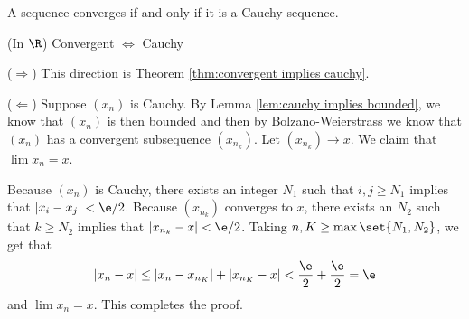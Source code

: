 \documentclass[class=article, crop=false]{standalone}
\begin{document}
\begin{thm}[Completeness of $\R$]{\label{thm:completeness of R}}
    A sequence converges if and only if it is a Cauchy sequence.
\end{thm}
\begin{slogan}
    (In $\R$) Convergent $\iff$ Cauchy
\end{slogan}
\begin{pf}
    ($\Rightarrow$) This direction is Theorem \ref{thm:convergent implies cauchy}.

    ($\Leftarrow$) Suppose $(x_n)$ is Cauchy. By Lemma \ref{lem:cauchy implies bounded}, we know that $(x_n)$ is then bounded and then by Bolzano-Weierstrass we know that $(x_n)$ has a convergent subsequence $(x_{n_k})$. Let $(x_{n_k}) \to x$. We claim that $\lim x_n = x$.

    Because $(x_n)$ is Cauchy, there exists an integer $N_1$ such that $i,j \geq N_1$ implies that $|x_i-x_j| < \e/2$. Because $(x_{n_k})$ converges to $x$, there exists an $N_2$ such that $k \geq N_2$ implies that $|x_{n_k} - x| < \e/2$. Taking $n,K \geq \max \set{N_1, N_2}$, we get that
        \[
            |x_n-x| \leq |x_n-x_{n_K}| + |x_{n_K} -x| < \frac{\e}{2} + \frac{\e}{2} = \e
        \]
    and $\lim x_n = x$. This completes the proof.
\end{pf}
\end{document}

